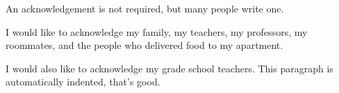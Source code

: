 An acknowledgement is not required, but many people write one.

I would like to acknowledge my family, my teachers, my professors, my roommates, and the people who delivered food to my apartment.

I would also like to acknowledge my grade school teachers.
This paragraph is automatically indented, that's good.


